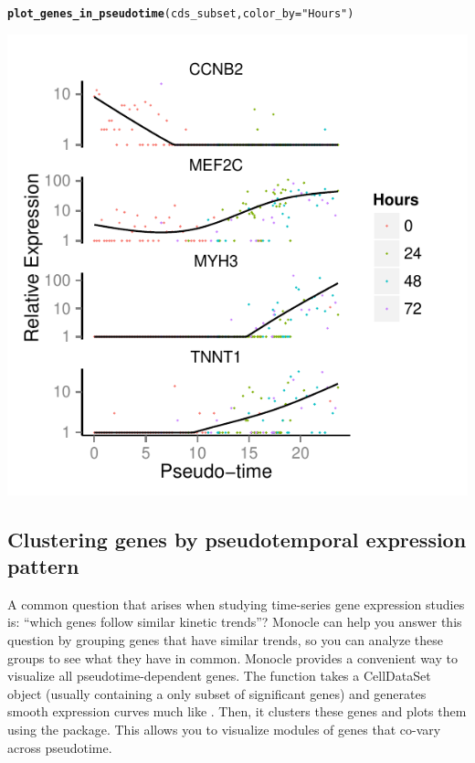 \documentclass[10pt,oneside]{article}\usepackage[]{graphicx}\usepackage[]{color}
\makeatletter
\def\maxwidth{ %
  \ifdim\Gin@nat@width>\linewidth
    \linewidth
  \else
    \Gin@nat@width
  \fi
}
\newcommand{\hlstr}[1]{\textcolor[rgb]{0.192,0.494,0.8}{#1}}%
\newcommand{\hlstd}[1]{\textcolor[rgb]{0.345,0.345,0.345}{#1}}%
\newcommand{\hlkwc}[1]{\textcolor[rgb]{0.333,0.667,0.333}{#1}}%
\newcommand{\hlkwd}[1]{\textcolor[rgb]{0.737,0.353,0.396}{\textbf{#1}}}%
\newenvironment{kframe}{%
 \def\at@end@of@kframe{}%
 \ifinner\ifhmode%
  \def\at@end@of@kframe{\end{minipage}}%
  \begin{minipage}{\columnwidth}%
 \fi\fi%
 \def\FrameCommand##1{\hskip\@totalleftmargin \hskip-\fboxsep
 \colorbox{shadecolor}{##1}\hskip-\fboxsep
     \hskip-\linewidth \hskip-\@totalleftmargin \hskip\columnwidth}%
 \MakeFramed {\advance\hsize-\width
   \@totalleftmargin\z@ \linewidth\hsize
   \@setminipage}}%
 {\par\unskip\endMakeFramed%
 \at@end@of@kframe}
\newenvironment{knitrout}{}{} %
\makeatother
\begin{document}
\begin{knitrout}
\color{fgcolor}\begin{kframe}
\begin{alltt}
\hlkwd{plot_genes_in_pseudotime}\hlstd{(cds_subset,} \hlkwc{color_by}\hlstd{=}\hlstr{"Hours"}\hlstd{)}
\end{alltt}
\end{kframe}

{\centering \includegraphics[width=\maxwidth]{figure/plot_diff_res_pt-1} 

}



\end{knitrout}

\subsection{Clustering genes by pseudotemporal expression pattern}

A common question that arises when studying time-series gene expression studies is: ``which genes follow similar kinetic trends''?  Monocle can help you answer this question by grouping genes that have similar trends, so you can analyze these groups to see what they have in common.  Monocle provides a convenient way to visualize all pseudotime-dependent genes. The function
 takes a CellDataSet object (usually containing a only subset of significant genes)
and generates smooth expression curves much like  . Then, it clusters these genes 
and plots them using the  package.  This allows you to visualize modules of genes that
co-vary across pseudotime.
\end{document}
